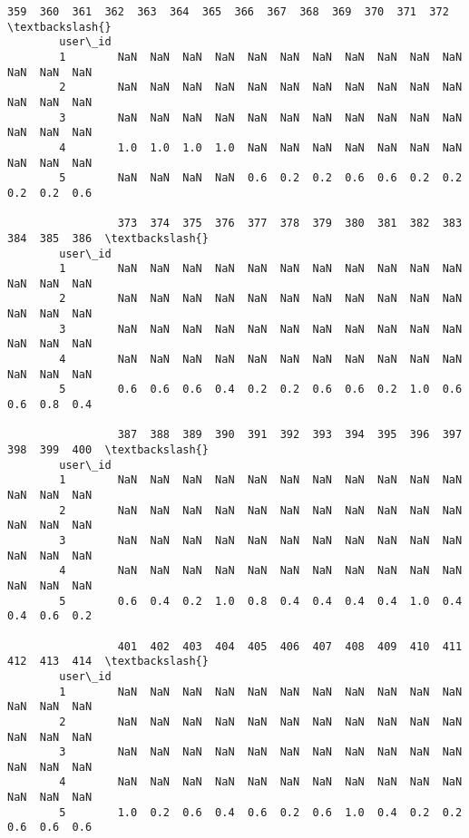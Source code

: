 \documentclass[11pt]{article}
\begin{document}
\begin{Verbatim}[commandchars=\\\{\}]
                 359  360  361  362  363  364  365  366  367  368  369  370  371  372  \textbackslash{}
        user\_id                                                                         
        1        NaN  NaN  NaN  NaN  NaN  NaN  NaN  NaN  NaN  NaN  NaN  NaN  NaN  NaN   
        2        NaN  NaN  NaN  NaN  NaN  NaN  NaN  NaN  NaN  NaN  NaN  NaN  NaN  NaN   
        3        NaN  NaN  NaN  NaN  NaN  NaN  NaN  NaN  NaN  NaN  NaN  NaN  NaN  NaN   
        4        1.0  1.0  1.0  1.0  NaN  NaN  NaN  NaN  NaN  NaN  NaN  NaN  NaN  NaN   
        5        NaN  NaN  NaN  NaN  0.6  0.2  0.2  0.6  0.6  0.2  0.2  0.2  0.2  0.6   
        
                 373  374  375  376  377  378  379  380  381  382  383  384  385  386  \textbackslash{}
        user\_id                                                                         
        1        NaN  NaN  NaN  NaN  NaN  NaN  NaN  NaN  NaN  NaN  NaN  NaN  NaN  NaN   
        2        NaN  NaN  NaN  NaN  NaN  NaN  NaN  NaN  NaN  NaN  NaN  NaN  NaN  NaN   
        3        NaN  NaN  NaN  NaN  NaN  NaN  NaN  NaN  NaN  NaN  NaN  NaN  NaN  NaN   
        4        NaN  NaN  NaN  NaN  NaN  NaN  NaN  NaN  NaN  NaN  NaN  NaN  NaN  NaN   
        5        0.6  0.6  0.6  0.4  0.2  0.2  0.6  0.6  0.2  1.0  0.6  0.6  0.8  0.4   
        
                 387  388  389  390  391  392  393  394  395  396  397  398  399  400  \textbackslash{}
        user\_id                                                                         
        1        NaN  NaN  NaN  NaN  NaN  NaN  NaN  NaN  NaN  NaN  NaN  NaN  NaN  NaN   
        2        NaN  NaN  NaN  NaN  NaN  NaN  NaN  NaN  NaN  NaN  NaN  NaN  NaN  NaN   
        3        NaN  NaN  NaN  NaN  NaN  NaN  NaN  NaN  NaN  NaN  NaN  NaN  NaN  NaN   
        4        NaN  NaN  NaN  NaN  NaN  NaN  NaN  NaN  NaN  NaN  NaN  NaN  NaN  NaN   
        5        0.6  0.4  0.2  1.0  0.8  0.4  0.4  0.4  0.4  1.0  0.4  0.4  0.6  0.2   
        
                 401  402  403  404  405  406  407  408  409  410  411  412  413  414  \textbackslash{}
        user\_id                                                                         
        1        NaN  NaN  NaN  NaN  NaN  NaN  NaN  NaN  NaN  NaN  NaN  NaN  NaN  NaN   
        2        NaN  NaN  NaN  NaN  NaN  NaN  NaN  NaN  NaN  NaN  NaN  NaN  NaN  NaN   
        3        NaN  NaN  NaN  NaN  NaN  NaN  NaN  NaN  NaN  NaN  NaN  NaN  NaN  NaN   
        4        NaN  NaN  NaN  NaN  NaN  NaN  NaN  NaN  NaN  NaN  NaN  NaN  NaN  NaN   
        5        1.0  0.2  0.6  0.4  0.6  0.2  0.6  1.0  0.4  0.2  0.2  0.6  0.6  0.6   
        

\end{Verbatim}
\end{document}
